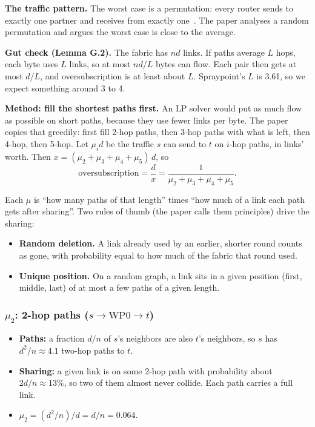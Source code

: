 \textbf{The traffic pattern.} The worst case is a permutation: every router sends to exactly one partner and receives from exactly one~\cite{namyar}. The paper analyses a random permutation and argues the worst case is close to the average.

\textbf{Gut check (Lemma G.2).} The fabric has $n d$ links. If paths average $L$ hops, each byte uses $L$ links, so at most $n d / L$ bytes can flow. Each pair then gets at most $d / L$, and oversubscription is at least about $L$. Spraypoint's $L$ is 3.61, so we expect something around 3 to 4.

\textbf{Method: fill the shortest paths first.} An LP solver would put as much flow as possible on short paths, because they use fewer links per byte. The paper copies that greedily: first fill 2-hop paths, then 3-hop paths with what is left, then 4-hop, then 5-hop. Let $\mu_i d$ be the traffic $s$ can send to $t$ on $i$-hop paths, in links' worth. Then $x = (\mu_2 + \mu_3 + \mu_4 + \mu_5)\, d$, so
\[
\text{oversubscription} = \frac{d}{x} = \frac{1}{\mu_2 + \mu_3 + \mu_4 + \mu_5}.
\]

Each $\mu$ is ``how many paths of that length'' times ``how much of a link each path gets after sharing''. Two rules of thumb (the paper calls them principles) drive the sharing:
\begin{itemize}
  \item \textbf{Random deletion.} A link already used by an earlier, shorter round counts as gone, with probability equal to how much of the fabric that round used.
  \item \textbf{Unique position.} On a random graph, a link sits in a given position (first, middle, last) of at most a few paths of a given length.
\end{itemize}

\subsubsection*{$\mu_2$: 2-hop paths ($s \to \text{WP0} \to t$)}

\begin{itemize}
  \item \textbf{Paths:} a fraction $d/n$ of $s$'s neighbors are also $t$'s neighbors, so $s$ has $d^2/n \approx 4.1$ two-hop paths to $t$.
  \item \textbf{Sharing:} a given link is on some 2-hop path with probability about $2d/n \approx 13\%$, so two of them almost never collide. Each path carries a full link.
  \item $\mu_2 = (d^2/n) / d = d/n = \mathbf{0.064}$.
\end{itemize}

